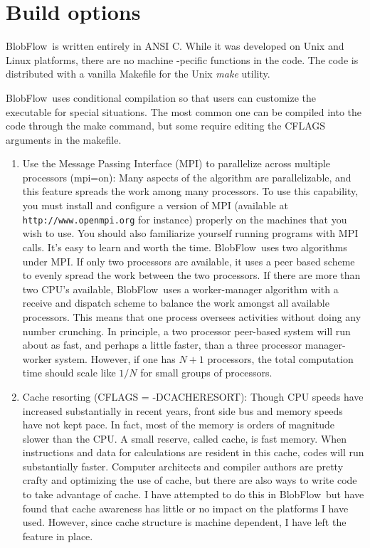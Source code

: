 \documentclass[12pt]{report}
\newcommand{\BF}{BlobFlow}
\begin{document}
\section{Build options}

\BF~is written entirely in ANSI C.  While it was developed on Unix and Linux
platforms, there are no machine -pecific functions in the code.  The code is
distributed with a vanilla Makefile for the Unix {\em make} utility.

\BF~uses conditional compilation so that users can customize the
executable for special situations.  The most common one can be compiled into the
code through the make command, but some require editing the CFLAGS arguments in
the makefile.
\begin{enumerate}

\item Use the Message Passing Interface (MPI) to parallelize across multiple
processors (mpi=on): Many aspects of the algorithm are parallelizable, and
this feature spreads the work among many processors.  To use this
capability, you must install and configure a version of MPI (available at {\tt
http://www.openmpi.org} for instance) properly on the machines that you wish to
use.
You should also familiarize yourself running programs with MPI calls.  It's
easy to learn and worth the time.  \BF~uses two algorithms under MPI.
If only two processors are available, it uses a peer based scheme to evenly
spread the work between the two processors.  If there are more than two
CPU's available, \BF~uses a worker-manager algorithm with a receive and
dispatch scheme to balance the work amongst all available processors.  This
means that one process oversees activities
without doing any number crunching.  In principle, a two processor peer-based
system will run about as fast, and perhaps a little faster, than a three
processor manager-worker system.  However, if one has $N+1$ processors, the
total computation time should scale like $1/N$ for small groups of processors.

\item Cache resorting (CFLAGS = -DCACHERESORT): Though CPU speeds have increased
substantially in recent years, front side bus and memory speeds have not
kept pace.  In fact, most of the memory is orders of
magnitude slower than the CPU.  A small reserve, called cache, is fast
memory.  When instructions and data for calculations are resident in this
cache, codes will run substantially faster.  Computer architects and
compiler authors are pretty crafty and optimizing the use of cache, but
there are also ways to write code to take advantage of cache.  I have
attempted to do this in \BF~but have found that cache awareness has
little or no impact on the platforms I have used.  However, since cache
structure is machine dependent, I have left the feature in place.


\end{enumerate}
\end{document}
